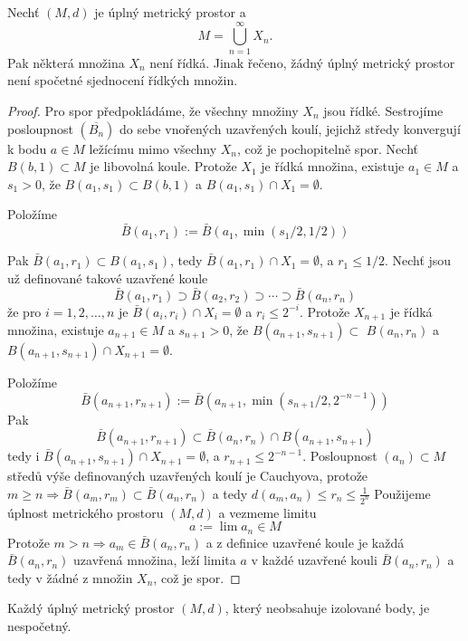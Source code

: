 \documentclass[../main.tex]{subfiles}
\begin{document}
\begin{theorem}[Baireova]
    Nechť $(M,d)$ je úplný metrický prostor a \[ M = \bigcup_{n=1}^{\infty} X_n. \]
    Pak některá množina $X_n$ není řídká. Jinak řečeno, žádný úplný metrický prostor není spočetné sjednocení řídkých množin.
\end{theorem}
\begin{proof}
    Pro spor předpokládáme, že všechny množiny $X_n$ jsou řídké. Sestrojíme posloupnost $\left(\overline{B_n}\right)$ do sebe vnořených 
    uzavřených koulí, jejichž středy konvergují k bodu $a \in M$ ležícímu mimo všechny $X_n$, což je pochopitelně spor.
    Nechť $B(b, 1) \subset M$ je libovolná koule. Protože $X_1$ je řídká množina, existuje 
    $a_1 \in M$ a $s_1>0$, že $B\left(a_1, s_1\right) \subset B(b, 1)$ a $B\left(a_1, s_1\right) \cap X_1=\emptyset$. 
    
    Položíme
    \[\bar{B}\left(a_1, r_1\right):=\bar{B}\left(a_1, \min \left(s_1 / 2,1 / 2\right)\right)\]

    Pak $\bar{B}\left(a_1, r_1\right) \subset B\left(a_1, s_1\right)$, tedy $\bar{B}\left(a_1, r_1\right) \cap X_1=\emptyset$, a $r_1 \leq 1 / 2$. 
    Nechť jsou už definované takové uzavřené koule
    \[\bar{B}\left(a_1, r_1\right) \supset \bar{B}\left(a_2, r_2\right) \supset \cdots \supset \bar{B}\left(a_n, r_n\right)\]
    že pro $i=1,2, \ldots, n$ je $\bar{B}\left(a_i, r_i\right) \cap X_i=\emptyset$ a $r_i \leq 2^{-i}$. Protože $X_{n+1}$ je řídká množina, 
    existuje $a_{n+1} \in M$ a $s_{n+1}>0$, že $B\left(a_{n+1}, s_{n+1}\right) \subset$ $B\left(a_n, r_n\right)$ a $B\left(a_{n+1}, s_{n+1}\right) \cap X_{n+1}=\emptyset$. 

    Položíme
    \[\bar{B}\left(a_{n+1}, r_{n+1}\right):=\bar{B}\left(a_{n+1}, \min \left(s_{n+1} / 2,2^{-n-1}\right)\right)\]
    Pak
    \[\bar{B}\left(a_{n+1}, r_{n+1}\right) \subset \bar{B}\left(a_n, r_n\right) \cap B\left(a_{n+1}, s_{n+1}\right)\]
    tedy i $\bar{B}\left(a_{n+1}, s_{n+1}\right) \cap X_{n+1}=\emptyset$, a $r_{n+1} \leq 2^{-n-1}$.
    Posloupnost $\left(a_n\right) \subset M$ středů výše definovaných uzavřených koulí je Cauchyova, protože
    $m \geq n \Rightarrow \bar{B}\left(a_m, r_m\right) \subset \bar{B}\left(a_n, r_n\right)$ a tedy $d\left(a_m, a_n\right) \leq r_n \leq \frac{1}{2^n}$
    Použijeme úplnost metrického prostoru $(M, d)$ a vezmeme limitu
    \[a:=\lim a_n \in M\]
    Protože $m > n \Rightarrow a_m \in \bar{B}(a_n,r_n)$ a z definice uzavřené koule je každá $\bar{B}(a_n,r_n)$ uzavřená množina, leží limita $a$ v 
    každé uzavřené kouli $\bar{B}(a_n,r_n)$ a tedy v žádné z množin $X_n$, což je spor.
\end{proof}

\begin{consequence}
    Každý úplný metrický prostor $(M,d)$, který neobsahuje izolované body, je nespočetný.
\end{consequence}
\end{document}
